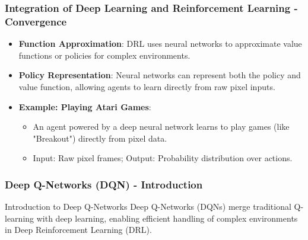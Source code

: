 \documentclass[aspectratio=169]{beamer}
\begin{document}
\begin{frame}[fragile]
    \frametitle{Integration of Deep Learning and Reinforcement Learning - Convergence}
    \begin{itemize}
        \item \textbf{Function Approximation}: DRL uses neural networks to approximate value functions or policies for complex environments.
        
        \item \textbf{Policy Representation}: Neural networks can represent both the policy and value function, allowing agents to learn directly from raw pixel inputs.
        
        \item \textbf{Example: Playing Atari Games}:
        \begin{itemize}
            \item An agent powered by a deep neural network learns to play games (like "Breakout") directly from pixel data.
            \item Input: Raw pixel frames; Output: Probability distribution over actions.
        \end{itemize}
    \end{itemize}
\end{frame}

\begin{frame}[fragile]
  \frametitle{Deep Q-Networks (DQN) - Introduction}
  \begin{block}{Introduction to Deep Q-Networks}
    Deep Q-Networks (DQNs) merge traditional Q-learning with deep learning, enabling efficient handling of complex environments in Deep Reinforcement Learning (DRL).
  \end{block}
\end{frame}
\end{document}
